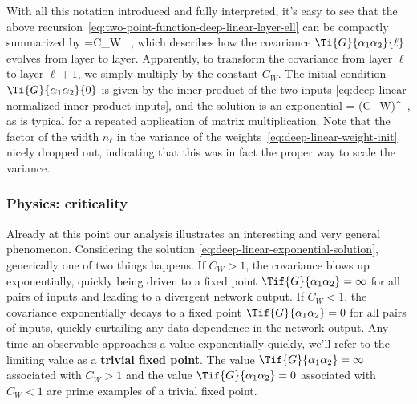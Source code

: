 With all this notation introduced and fully interpreted, it's easy to see that the above recursion~\eqref{eq:two-point-function-deep-linear-layer-ell} can be compactly summarized by %
\be\label{eq:deep-linear-kernel-recursion}
 =C_W  \, ,
\ee
which describes how the covariance $\Ti{G}{\alpha_1\alpha_2}{\ell}$ evolves from layer to layer.
Apparently, to transform the covariance from layer $\ell$ to layer $\ell+1$, we simply multiply by the constant $C_W$.  The initial condition $\Ti{G}{\alpha_1\alpha_2}{0}$ is given by the inner product of the two inputs \eqref{eq:deep-linear-normalized-inner-product-inputs}, and the solution is an exponential
\be\label{eq:deep-linear-exponential-solution}
 = \le(C_W\ri)^{\ell}\, ,
\ee
as is typical for a repeated application of 
matrix multiplication. 
Note that the factor of the width $n_{\ell}$ in the variance of the weights~\eqref{eq:deep-linear-weight-init} nicely dropped out, indicating that this was in fact the proper way to scale the variance.




\subsubsection{Physics: criticality}
Already at this point our analysis illustrates an interesting and very general phenomenon. 
Considering the solution \eqref{eq:deep-linear-exponential-solution}, generically one of two things happens.
If $C_W> 1$, the covariance blows up exponentially, quickly being driven to a fixed point $\Tif{G}{\alpha_1\alpha_2} = \infty$ for all pairs of inputs and leading to a divergent network output.
If $C_W< 1$, the covariance exponentially decays to a fixed point $\Tif{G}{\alpha_1\alpha_2} = 0$ for all pairs of inputs, quickly curtailing any data dependence in the network output. 
Any time an observable approaches a value exponentially quickly, we'll refer to the limiting value as a \textbf{trivial fixed point}. The value $\Tif{G}{\alpha_1\alpha_2} = \infty$ associated with $C_W>1$ and the value $\Tif{G}{\alpha_1\alpha_2} = 0$ associated with $C_W<1$ are prime examples of a trivial fixed point.

